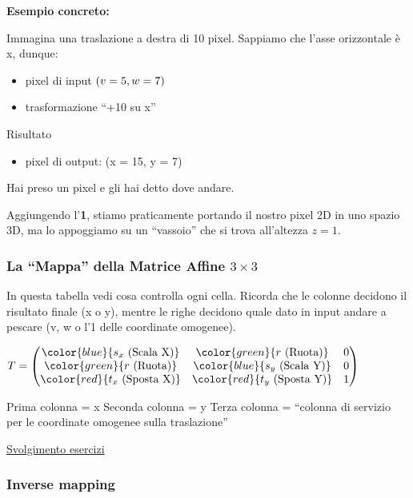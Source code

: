 \textbf{Esempio concreto:}

Immagina una traslazione a destra di 10 pixel. Sappiamo che l'asse
orizzontale è x, dunque:

\begin{itemize}
\tightlist
\item
  pixel di input \((v = 5, \space w = 7)\)
\item
  trasformazione ``+10 su x''
\end{itemize}

Risultato

\begin{itemize}
\tightlist
\item
  pixel di output: (x = 15, y = 7)
\end{itemize}

Hai preso un pixel e gli hai detto dove andare.

Aggiungendo l'\textbf{1}, stiamo praticamente portando il nostro pixel
2D in uno spazio 3D, ma lo appoggiamo su un ``vassoio'' che si trova
all'altezza \(z = 1\).

\subsubsection{\texorpdfstring{La ``Mappa'' della Matrice Affine
\(3 \times 3\)}{La ``Mappa'' della Matrice Affine 3 \textbackslash times 3}}\label{la-mappa-della-matrice-affine-3-times-3}

In questa tabella vedi cosa controlla ogni cella. Ricorda che le colonne
decidono il risultato finale (x o y), mentre le righe decidono quale
dato in input andare a pescare (v, w o l'1 delle coordinate omogenee).

\(T = \begin{pmatrix}
\color{blue}{s_x \text{ (Scala X)}} & \color{green}{r \text{ (Ruota)}} & 0 \\
\color{green}{r \text{ (Ruota)}} & \color{blue}{s_y \text{ (Scala Y)}} & 0 \\
\color{red}{t_x \text{ (Sposta X)}} & \color{red}{t_y \text{ (Sposta Y)}} & 1
\end{pmatrix}\)

Prima colonna = x Seconda colonna = y Terza colonna = ``colonna di
servizio per le coordinate omogenee sulla traslazione''

\href{Lezione\%202\%20Operazioni\%20sulle\%20matrici/Svolgimento\%20esercizi\%202d11cf23380e80b6b137f81c6d70ed5a.md}{Svolgimento
esercizi}

\subsubsection{Inverse mapping}\label{inverse-mapping}


